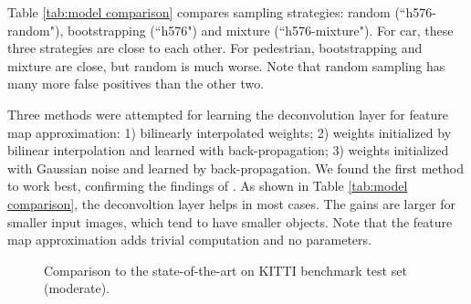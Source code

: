 \documentclass[runningheads]{llncs}
\begin{document}
Table \ref{tab:model comparison} compares sampling strategies: random (``h576-random"), bootstrapping (``h576") and mixture (``h576-mixture"). For car, these three strategies are close to each other. For pedestrian, bootstrapping and mixture are close, but random is much worse. Note that random sampling has many more false positives than the other two.

Three methods were attempted for learning the deconvolution layer for feature map approximation: 1) bilinearly interpolated weights; 2) weights initialized by bilinear interpolation and learned with back-propagation; 3) weights initialized with Gaussian noise and learned by back-propagation.
We found the first method to work best, confirming the findings
of \cite{DBLP:conf/cvpr/LongSD15,DBLP:conf/iccv/XieT15}.
As shown in Table \ref{tab:model comparison}, the deconvoltion layer helps
in most cases. The gains are larger for smaller input images, which
tend to have smaller objects. Note that the feature map approximation adds trivial computation and no parameters.


\begin{figure*}[!t]
\begin{minipage}[b]{.32\linewidth}
\centering
\centerline{}
\end{minipage}
\hfill
\begin{minipage}[b]{.32\linewidth}
\centering
\centerline{}
\end{minipage}
\hfill
\begin{minipage}[b]{.32\linewidth}
\centering
\centerline{}
\end{minipage}
\caption{Comparison to the state-of-the-art on KITTI benchmark test set (moderate).}
\label{fig:kitti detection}
\end{figure*}
\end{document}
